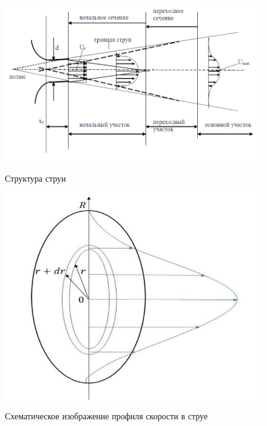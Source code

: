             \begin{figure}[h]
                \centering
                \begin{minipage}{0.6\textwidth}
                    \centering
                    \includegraphics[width=0.9\linewidth]{structure}
                    \caption{Структура струи}
                    \label{fig:structure}
                \end{minipage}\hfill
                \begin{minipage}{0.4\textwidth}
                    \centering
                    \includegraphics[width=0.9\linewidth]{profile}
                    \caption{Схематическое изображение профиля скорости в струе}
                    \label{fig:profile}
                \end{minipage}
            \end{figure}

            \newpage


